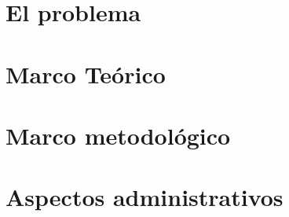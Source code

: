 









\mainmatter
\setcounter{page}{1} %
\Centerformat									%

\chapter{El problema}
	

\chapter{Marco Teórico}
	 

\chapter{Marco metodológico}
	

\chapter{Aspectos administrativos}
	


\FrontBackStyle
\CenterformatBack
{}

\singlespacing
\printbibliography[title={REFERENCIAS},heading=bibintoc]	%


